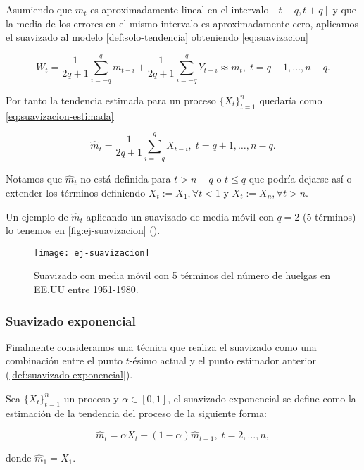 Asumiendo que $m_t$ es aproximadamente lineal en el intervalo $[t - q, t + q]$ y que la media de los errores en el mismo intervalo es aproximadamente cero, aplicamos el suavizado al modelo \autoref{def:solo-tendencia} obteniendo \eqref{eq:suavizacion}

\begin{equation}
  W_t = \dfrac{1}{2q + 1} \sum \limits^q_{i = -q} m_{t - i} + \dfrac{1}{2q + 1} \sum \limits^q_{i = -q} Y_{t - i} \approx m_t, \; t = q + 1, \ldots, n - q.
  \label{eq:suavizacion}
\end{equation}

Por tanto la tendencia estimada para un proceso $\{X_t\}_{t = 1}^n$ quedaría como \eqref{eq:suavizacion-estimada}

\begin{equation}
  \hat{m}_t = \dfrac{1}{2q + 1} \sum \limits^q_{i = -q} X_{t - i}, \; t = q + 1, \ldots, n - q.
  \label{eq:suavizacion-estimada}
\end{equation}

Notamos que $\hat{m}_t$ no está definida para $t > n - q$ o $t \leq q$ que podría dejarse así o extender los términos definiendo $X_t := X_1, \forall t < 1$ y $X_t := X_n, \forall t > n$.

Un ejemplo de $\hat{m}_t$ aplicando un suavizado de media móvil con $q = 2$ (5 términos) lo tenemos en \autoref{fig:ej-suavizacion} (\cite{brockwell2002introduction}).

\begin{figure}[htpb]
  \centering
  \texttt{[image: ej-suavizacion]}
  \caption{Suavizado con media móvil con 5 términos del número de huelgas en EE.UU entre 1951-1980.}
  \label{fig:ej-suavizacion}
\end{figure}

\subsubsection{Suavizado exponencial}

Finalmente consideramos una técnica que realiza el suavizado como una combinación entre el punto $t$-ésimo actual y el punto estimador anterior (\autoref{def:suavizado-exponencial}).

\begin{definicion}
  Sea $\{X_t\}_{t = 1}^n$ un proceso y $\alpha \in [0, 1]$, el suavizado exponencial se define como la estimación de la tendencia del proceso de la siguiente forma:

  $$\hat{m}_t = \alpha X_t + (1 - \alpha)\hat{m}_{t - 1}, \; t = 2, \ldots, n,$$

  donde $\hat{m}_1 = X_1$.
  \label{def:suavizado-exponencial}
\end{definicion}

